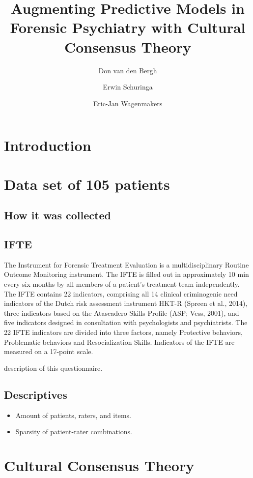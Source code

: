 \documentclass[a4paper,11pt]{article}
\title{Augmenting Predictive Models in Forensic Psychiatry with Cultural Consensus Theory}
\author[1]{Don van den Bergh}
\author[2]{Erwin Schuringa}
\author[1]{Eric-Jan Wagenmakers}
\affil[1]{Department of Psychological Methods, University of Amsterdam}
\affil[2]{Forensic Psychiatric Centre Dr. S. van Mesdag}
\date{}
\begin{document}
\maketitle

\tableofcontents

\begin{abstract}
	
\end{abstract}

\section{Introduction}


\section{Data set of 105 patients}
\subsection{How it was collected}
\subsection{IFTE}
The Instrument for Forensic Treatment Evaluation is a multidisciplinary Routine Outcome Monitoring instrument. The IFTE is filled out in approximately 10 min every six months by all members of a patient's treatment team independently. The IFTE contains 22 indicators, comprising all 14 clinical criminogenic need indicators of the
Dutch risk assessment instrument HKT-R (Spreen et al., 2014), three indicators based on the Atascadero Skills Profile (ASP; Vess, 2001), and five indicators designed in consultation with psychologists and psychiatrists. The 22 IFTE indicators are divided into three factors, namely Protective behaviors, Problematic behaviors and Resocialization Skills. Indicators of the IFTE are measured on a 17-point scale.


description of this questionnaire.
\subsection{Descriptives}
\begin{itemize}
	\item Amount of patients, raters, and items.
	\item Sparsity of patient-rater combinations.
\end{itemize}


\section{Cultural Consensus Theory}
\end{document}
